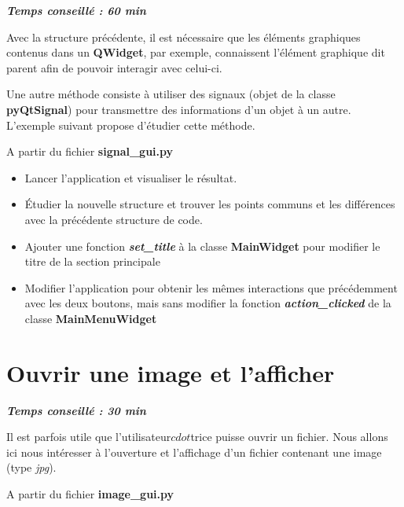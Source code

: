 \documentclass[a4paper,11pt,titlepage]{article} %
\begin{document}
\begin{center} \textbf{\textit{Temps conseillé : 60 min}} \end{center}

Avec la structure précédente, il est nécessaire que les éléments graphiques contenus dans un \textbf{QWidget}, par exemple, connaissent l'élément graphique dit parent afin de pouvoir interagir avec celui-ci.

Une autre méthode consiste à utiliser des signaux (objet de la classe \textbf{pyQtSignal}) pour transmettre des informations d'un objet à un autre. L'exemple suivant propose d'étudier cette méthode.

A partir du fichier \textbf{signal\_gui.py}

\begin{itemize}
	\item Lancer l'application et visualiser le résultat.
	\item Étudier la nouvelle structure et trouver les points communs et les différences avec la précédente structure de code.
	
	\medskip
	
	\item Ajouter une fonction \textsl{\textbf{set\_title}} à la classe \textbf{MainWidget} pour modifier le titre de la section principale
	\item Modifier l'application pour obtenir les mêmes interactions que précédemment avec les deux boutons, mais sans modifier la fonction \textsl{\textbf{action\_clicked}} de la classe \textbf{MainMenuWidget}
\end{itemize}


\section{Ouvrir une image et l'afficher}

\begin{center} \textbf{\textit{Temps conseillé : 30 min}} \end{center}

Il est parfois utile que l'utilisateur$cdot$trice puisse ouvrir un fichier. Nous allons ici nous intéresser à l'ouverture et l'affichage d'un fichier contenant une image (type \textit{jpg}).

A partir du fichier \textbf{image\_gui.py}
\end{document}
